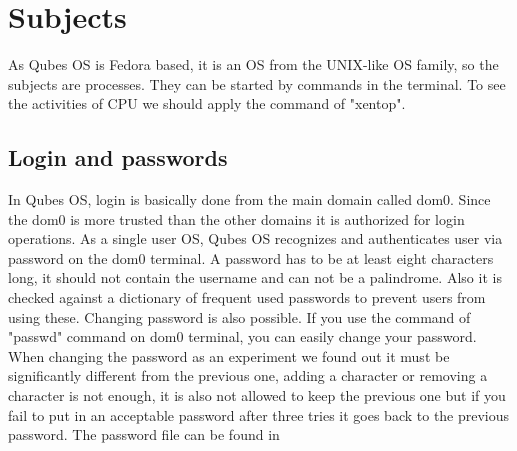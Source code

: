 \documentclass[runningheads,a4paper]{article}
\begin{document}
\section{Subjects}

As Qubes OS is Fedora based, it is an OS from the UNIX-like OS family,
so the
subjects are processes. They can be started by commands in the
terminal. To see the activities of CPU we should apply the command of
"xentop". 

\subsection{Login and passwords} 

In Qubes OS, login is basically done
from the main domain called dom0.  Since the dom0 is more trusted than
the other domains it is authorized for login operations.  As a single
user OS, Qubes OS recognizes and authenticates user via password on
the dom0 terminal. A password has to be at least eight characters long, it should not contain the username and can not be a palindrome. Also it is checked against a dictionary of frequent used passwords to prevent users from using these. Changing password is also possible.  If you use
the command of "passwd" command on dom0 terminal, you can easily
change your password.  When changing the password as an experiment we found out it must be significantly different from the previous one, adding a character or removing a character is not enough, it is also not allowed to keep the previous one but if you fail to put in an acceptable password after three tries it goes back to the previous password. The password file can be found in %
\end{document}
